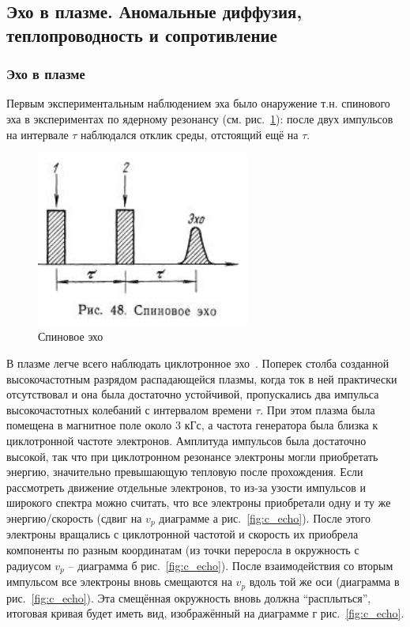 \documentclass[10pt, a4paper]{article}
\begin{document}
\subsection{Эхо в плазме. Аномальные диффузия, теплопроводность и сопротивление}

\subsubsection{Эхо в плазме} \label{subsubsec:plasma_echo}

Первым экспериментальным наблюдением эха было онаружение т.н. спинового эха в экспериментах по ядерному резонансу (см. рис.~\ref{fig:spin_echo}): после двух импульсов на интервале $\tau$ наблюдался отклик среды, отстоящий ещё на $\tau$.

\begin{figure}[ht]
	\begin{center}
		\includegraphics[width=70mm]{Echo_1_18.3.JPG}
	\end{center}
	\caption{Спиновое эхо}
	\label{fig:spin_echo}
\end{figure}

В плазме легче всего наблюдать циклотронное эхо~\cite{kadomtsev}. Поперек столба созданной высокочастотным разрядом распадающейся плазмы, когда ток в ней практически отсутствовал и она была достаточно устойчивой, пропускались два импульса высокочастотных колебаний с интервалом времени $\tau$. При этом плазма была помещена в магнитное поле около 3 кГс, а частота генератора была близка к циклотронной частоте электронов. Амплитуда импульсов была достаточно высокой, так что при циклотронном резонансе электроны могли приобретать энергию, значительно превышающую тепловую после прохождения.
Если рассмотреть движение отдельные электронов, то из-за узости импульсов и широкого спектра можно считать, что все электроны приобретали одну и ту же энергию/скорость (сдвиг на $v_p$ диаграмме а рис.~\ref{fig:c_echo}). После этого электроны вращались с циклотронной частотой и скорость их приобрела компоненты по разным координатам (из точки переросла в окружность с радиусом $v_p$ -- диаграмма б рис.~\ref{fig:c_echo}). После взаимодействия со вторым импульсом все электроны вновь смещаются на $v_p$ вдоль той же оси (диаграмма в рис.~\ref{fig:c_echo}). Эта смещённая окружность вновь должна ``расплыться'', итоговая кривая будет иметь вид, изображённый на диаграмме г рис.~\ref{fig:c_echo}. 
\end{document}
